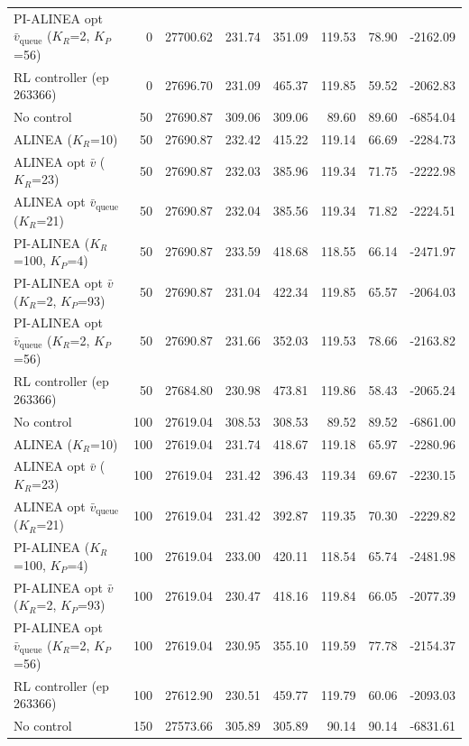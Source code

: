 \begin{longtable}{p{5.2cm}rrrrrrr}
PI-ALINEA opt $\bar{v}_{\mathrm{queue}}$ ($K_R$=2, $K_P$=56) & 0 & 27700.62 & 231.74 & 351.09 & 119.53 & 78.90 & -2162.09 \\
RL controller (ep 263366) & 0 & 27696.70 & 231.09 & 465.37 & 119.85 & 59.52 & -2062.83 \\
\midrule
No control & 50 & 27690.87 & 309.06 & 309.06 & 89.60 & 89.60 & -6854.04 \\
ALINEA ($K_R$=10) & 50 & 27690.87 & 232.42 & 415.22 & 119.14 & 66.69 & -2284.73 \\
ALINEA opt $\bar{v}$ ($K_R$=23) & 50 & 27690.87 & 232.03 & 385.96 & 119.34 & 71.75 & -2222.98 \\
ALINEA opt $\bar{v}_{\mathrm{queue}}$ ($K_R$=21) & 50 & 27690.87 & 232.04 & 385.56 & 119.34 & 71.82 & -2224.51 \\
PI-ALINEA ($K_R$=100, $K_P$=4) & 50 & 27690.87 & 233.59 & 418.68 & 118.55 & 66.14 & -2471.97 \\
PI-ALINEA opt $\bar{v}$ ($K_R$=2, $K_P$=93) & 50 & 27690.87 & 231.04 & 422.34 & 119.85 & 65.57 & -2064.03 \\
PI-ALINEA opt $\bar{v}_{\mathrm{queue}}$ ($K_R$=2, $K_P$=56) & 50 & 27690.87 & 231.66 & 352.03 & 119.53 & 78.66 & -2163.82 \\
RL controller (ep 263366) & 50 & 27684.80 & 230.98 & 473.81 & 119.86 & 58.43 & -2065.24 \\
\midrule
No control & 100 & 27619.04 & 308.53 & 308.53 & 89.52 & 89.52 & -6861.00 \\
ALINEA ($K_R$=10) & 100 & 27619.04 & 231.74 & 418.67 & 119.18 & 65.97 & -2280.96 \\
ALINEA opt $\bar{v}$ ($K_R$=23) & 100 & 27619.04 & 231.42 & 396.43 & 119.34 & 69.67 & -2230.15 \\
ALINEA opt $\bar{v}_{\mathrm{queue}}$ ($K_R$=21) & 100 & 27619.04 & 231.42 & 392.87 & 119.35 & 70.30 & -2229.82 \\
PI-ALINEA ($K_R$=100, $K_P$=4) & 100 & 27619.04 & 233.00 & 420.11 & 118.54 & 65.74 & -2481.98 \\
PI-ALINEA opt $\bar{v}$ ($K_R$=2, $K_P$=93) & 100 & 27619.04 & 230.47 & 418.16 & 119.84 & 66.05 & -2077.39 \\
PI-ALINEA opt $\bar{v}_{\mathrm{queue}}$ ($K_R$=2, $K_P$=56) & 100 & 27619.04 & 230.95 & 355.10 & 119.59 & 77.78 & -2154.37 \\
RL controller (ep 263366) & 100 & 27612.90 & 230.51 & 459.77 & 119.79 & 60.06 & -2093.03 \\
\midrule
No control & 150 & 27573.66 & 305.89 & 305.89 & 90.14 & 90.14 & -6831.61 \\

\end{longtable}
